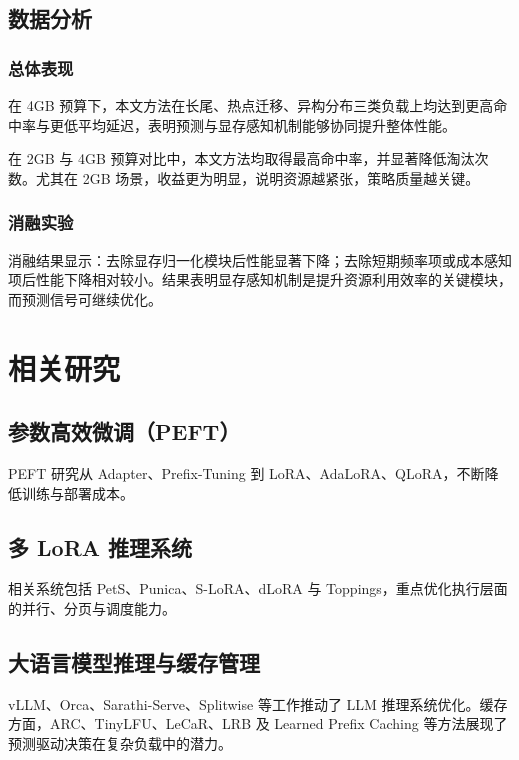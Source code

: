 \subsection{数据分析}
\subsubsection{总体表现}
在 4GB 预算下，本文方法在长尾、热点迁移、异构分布三类负载上均达到更高命中率与更低平均延迟，表明预测与显存感知机制能够协同提升整体性能。

在 2GB 与 4GB 预算对比中，本文方法均取得最高命中率，并显著降低淘汰次数。尤其在 2GB 场景，收益更为明显，说明资源越紧张，策略质量越关键。

\subsubsection{消融实验}
消融结果显示：去除显存归一化模块后性能显著下降；去除短期频率项或成本感知项后性能下降相对较小。结果表明显存感知机制是提升资源利用效率的关键模块，而预测信号可继续优化。

\section{相关研究}
\subsection{参数高效微调（PEFT）}
PEFT 研究从 Adapter、Prefix-Tuning 到 LoRA、AdaLoRA、QLoRA，不断降低训练与部署成本。

\subsection{多 LoRA 推理系统}
相关系统包括 PetS、Punica、S-LoRA、dLoRA 与 Toppings，重点优化执行层面的并行、分页与调度能力。

\subsection{大语言模型推理与缓存管理}
vLLM、Orca、Sarathi-Serve、Splitwise 等工作推动了 LLM 推理系统优化。缓存方面，ARC、TinyLFU、LeCaR、LRB 及 Learned Prefix Caching 等方法展现了预测驱动决策在复杂负载中的潜力。
